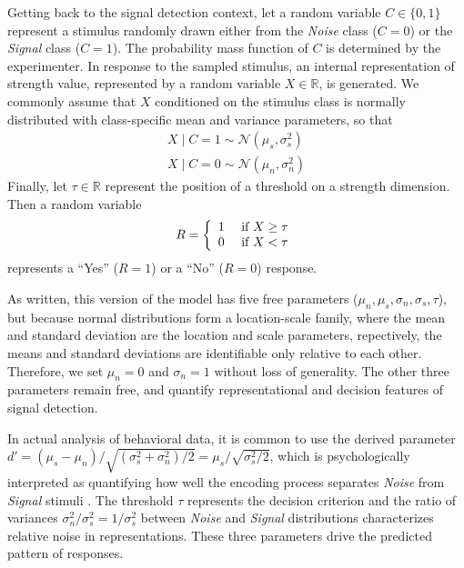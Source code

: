 \documentclass[12pt]{article}
\begin{document}
Getting back to the signal detection context, let a random variable $C \in \{0, 1\}$ represent a stimulus
randomly drawn either from the \textit{Noise} class ($C = 0$) or
the \textit{Signal} class ($C = 1$). The probability mass function of
$C$ is determined by the experimenter. In response to the sampled
stimulus, an internal representation of strength value, represented
by a random variable $X \in \mathbb{R}$, is generated. We commonly
assume that $X$ conditioned on the stimulus class is normally
distributed with class-specific mean and variance parameters, so that
%
\begin{align}\nonumber
X \mid C = 1 \sim \mathcal{N}(\mu_s, \sigma_s^2)\\
X \mid C = 0 \sim \mathcal{N}(\mu_n, \sigma_n^2)\end{align}
% 
Finally, let $\tau \in \mathbb{R}$ represent the position of a threshold on a strength dimension. Then a random variable
%
\begin{equation}
R = \left\{
	\begin{array}{l l}
     1 & \text{ if } X \geq \tau\\
     0 & \text{ if } X < \tau
     \end{array}\right.
\end{equation}
%
represents a ``Yes'' ($R=1$) or a ``No'' ($R=0$) response.

As written, this version of the model has five free
parameters ($\mu_n,\mu_s,\sigma_n,\sigma_s,\tau$), but
because normal distributions form a location-scale family, where the
mean and standard deviation are the location and scale parameters,
repectively, the means and standard deviations are identifiable only
relative to each other.  Therefore, we set $\mu_n = 0$ and $\sigma_n = 1$
without loss of generality. The other three parameters remain free,
and quantify representational and decision features of signal detection.

In actual analysis of behavioral data, it is common to use  the derived parameter $d' = (\mu_s - \mu_n)/\sqrt{(\sigma_s^2 + \sigma_n^2) / 2} = \mu_s/\sqrt{\sigma_s^2 / 2}$, which is psychologically interpreted as quantifying how well
the encoding process separates \textit{Noise} from \textit{Signal} stimuli \citep{MacCre2004}. 
The threshold
$\tau$ represents the decision criterion
%
and the ratio of variances
$\sigma_n^2/\sigma_s^2 = 1/\sigma_s^2$ between \textit{Noise}
and \textit{Signal} distributions characterizes relative noise in
representations. These three parameters drive the predicted pattern of
responses.
    
\end{document}
